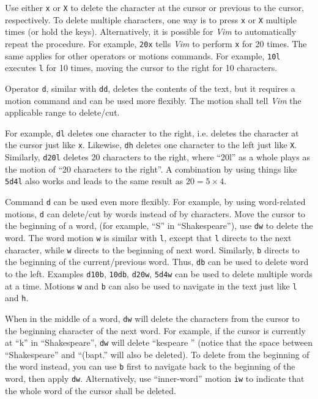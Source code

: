 Use either \verb|x| or \verb|X| to delete the character at the cursor or previous to the cursor, respectively. To delete multiple characters, one way is to press \verb|x| or \verb|X| multiple times (or hold the keys). Alternatively, it is possible for \textit{Vim} to automatically repeat the procedure. For example, \verb|20x| tells \textit{Vim} to perform \verb|x| for 20 times. The same applies for other operators or motions commands. For example, \verb|10l| executes \verb|l| for 10 times, moving the cursor to the right for 10 characters.

Operator \verb|d|, similar with \verb|dd|, deletes the contents of the text, but it requires a motion command and can be used more flexibly. The motion shall tell \textit{Vim} the applicable range to delete/cut.

For example, \verb|dl| deletes one character to the right, i.e. deletes the character at the cursor just like \verb|x|. Likewise, \verb|dh| deletes one character to the left just like \verb|X|. Similarly, \verb|d20l| deletes 20 characters to the right, where ``20l'' as a whole plays as the motion of ``20 characters to the right''. A combination by using things like \verb|5d4l| also works and leads to the same result as $20=5\times 4$.

Command \verb|d| can be used even more flexibly. For example, by using word-related motions, \verb|d| can delete/cut by words instead of by characters. Move the cursor to the beginning of a word, (for example, ``S'' in ``Shakespeare''), use \verb|dw| to delete the word. The word motion \verb|w| is similar with \verb|l|, except that \verb|l| directs to the next character, while \verb|w| directs to the beginning of next word. Similarly, \verb|b| directs to the beginning of the current/previous word. Thus, \verb|db| can be used to delete word to the left. Examples \verb|d10b|, \verb|10db|, \verb|d20w|, \verb|5d4w| can be used to delete multiple words at a time. Motions \verb|w| and \verb|b| can also be used to navigate in the text just like \verb|l| and \verb|h|.

When in the middle of a word, \verb|dw| will delete the characters from the cursor to the beginning character of the next word. For example, if the cursor is currently at ``k'' in ``Shakespeare'', \verb|dw| will delete ``kespeare '' (notice that the space between ``Shakespeare'' and ``(bapt.'' will also be deleted). To delete from the beginning of the word instead, you can use \verb|b| first to navigate back to the beginning of the word, then apply \verb|dw|. Alternatively, use ``inner-word'' motion \verb|iw| to indicate that the whole word of the cursor shall be deleted.

